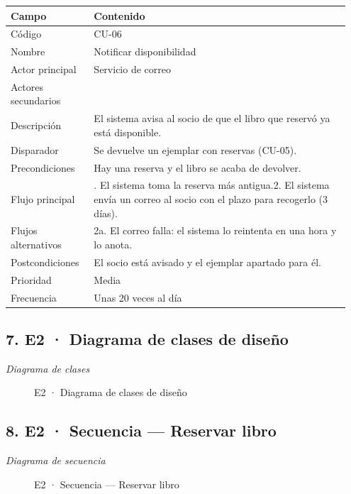{\small
\begin{longtable}{@{}>{\raggedright\arraybackslash}p{0.232\linewidth}>{\raggedright\arraybackslash}p{0.717\linewidth}@{}}
\toprule
\textbf{Campo} & \textbf{Contenido} \\
\midrule
\endhead
Código & CU-06 \\
Nombre & Notificar disponibilidad \\
Actor principal & Servicio de correo \\
Actores secundarios &  \\
Descripción & El sistema avisa al socio de que el libro que reservó ya está disponible. \\
Disparador & Se devuelve un ejemplar con reservas (CU-05). \\
Precondiciones & Hay una reserva y el libro se acaba de devolver. \\
Flujo principal & 1. El sistema toma la reserva más antigua.\newline{}2. El sistema envía un correo al socio con el plazo para recogerlo (3 días). \\
Flujos alternativos & 2a. El correo falla: el sistema lo reintenta en una hora y lo anota. \\
Postcondiciones & El socio está avisado y el ejemplar apartado para él. \\
Prioridad & Media \\
Frecuencia & Unas 20 veces al día \\
\bottomrule
\end{longtable}}

\subsection*{7. E2 · Diagrama de clases de diseño}

\emph{Diagrama de clases}

\begin{figure}[H]
\centering
{}
\caption{E2 · Diagrama de clases de diseño}
\end{figure}

\subsection*{8. E2 · Secuencia — Reservar libro}

\emph{Diagrama de secuencia}

\begin{figure}[H]
\centering
{}
\caption{E2 · Secuencia — Reservar libro}
\end{figure}

